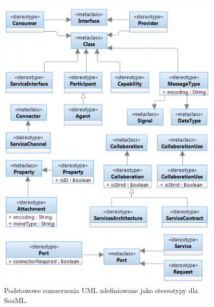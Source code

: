 \begin{figure}[h!tbp]
\begin{centering}
\includegraphics[width=11cm]{img/soaml_metamodel.png}
\caption[Podstawowe rozszerzenia UML zdefiniowane jako stereotypy dla SoaML.]{Podstawowe rozszerzenia UML zdefiniowane jako stereotypy dla SoaML. \cite{SoaMLErvBase}}\label{soaml_metamodel}
\end{centering}
\end{figure}

